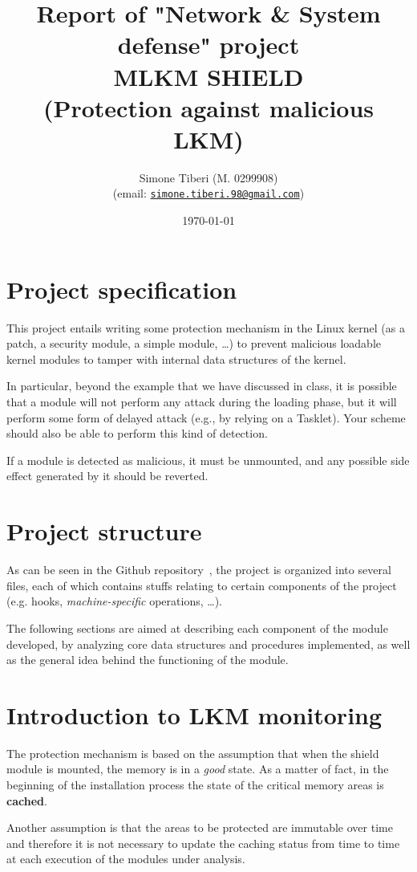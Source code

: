 \documentclass{article}
\title{\small Report of "Network \& System defense" project \\
\Huge \textbf{MLKM SHIELD}\\
\Large (Protection against malicious LKM)}
\author{Simone Tiberi (M. 0299908)\\%
(email: \texttt{\href{mailto:simone.tiberi.98@gmail.com}{simone.tiberi.98@gmail.com}})}
\date{\today}
\begin{document}
\maketitle
	\section{Project specification}
	This project entails writing some protection mechanism in the Linux kernel (as a patch, a security
	module, a simple module, \dots) to prevent malicious loadable kernel modules to tamper with
	internal data structures of the kernel.

	In particular, beyond the example that we have discussed in class, it is possible that a module will
	not perform any attack during the loading phase, but it will perform some form of delayed attack
	(e.g., by relying on a Tasklet). Your scheme should also be able to perform this kind of detection.

	If a module is detected as malicious, it must be unmounted, and any possible side effect
	generated by it should be reverted.

	\section{Project structure}
	As can be seen in the Github repository~\cite{github:repo}, the project is organized into several
	files, each of which contains stuffs relating to certain components of the project (e.g. hooks,
	\textit{machine-specific} operations, \dots).

	The following sections are aimed at describing each component of the module developed, by analyzing
	core data structures and procedures implemented, as well as the general idea behind the
	functioning of the module.

	\section{Introduction to LKM monitoring}
	The protection mechanism is based on the assumption that when the shield module is mounted, the memory is
	in a \textit{good} state. As a matter of fact, in the beginning of the installation process the state of
	the critical memory areas is \textbf{cached}.

	Another assumption is that the areas to be protected are immutable over time and therefore it is not necessary
	to update the caching status from time to time at each execution of the modules under analysis.
\end{document}
